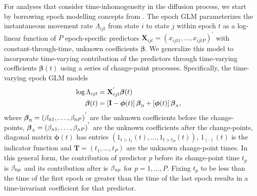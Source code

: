 \documentclass[11pt,oneside,letterpaper]{article}
\newcommand{\coefficient}{\ensuremath{\beta}}
\newcommand{\transpose}{^{'}}
\newcommand{\numPredictors}{P}
\newcommand{\timeIndicator}{\phi}
\newcommand{\indicatorFunction}[1]{\ensuremath{1_{ #1 }}}
\newcommand{\rateMatrixElementMAS}{\Lambda_{ijt}}
\newcommand{\markA}{\text{\tiny B}}
\newcommand{\markB}{\text{\tiny A}}
\begin{document}
For analyses that consider time-inhomogeneity in the diffusion process, we start by borrowing epoch modelling concepts from \cite{bielejec_epoch_2014}.
The epoch GLM parameterizes the instantaneous movement rate $\rateMatrixElementMAS$ from state $i$ to state $j$ within epoch $t$ as a log-linear function of $\numPredictors$ epoch-specific predictors $\mathbf{X}_{ijt} = \left( x_{ijt1} , \ldots, x_{ijt \numPredictors} \right)\transpose $ with constant-through-time, unknown coefficients $\boldsymbol{\coefficient}$. 
We generalize this model to incorporate time-varying contribution of the predictors through time-varying coefficients $\boldsymbol{\coefficient}(t)$ using
a series of change-point processes.  
Specifically, the time-varying epoch GLM models
\begin{equation}
\begin{aligned}
\log \rateMatrixElementMAS &= \mathbf{X}_{ijt}\transpose 
\boldsymbol{\beta} (t) \\
\boldsymbol{\beta} (t) &= 
\left[
\mathbf{I} - \boldsymbol{\timeIndicator}(t) \right] 
\boldsymbol{\coefficient}_{\markA} + 
\left[
\boldsymbol{\timeIndicator}(t) 
\right] \boldsymbol{\beta}_{\markB} ,
\end{aligned}
\end{equation}
%
where 
$\boldsymbol{\coefficient}_{\markA} = \left(\coefficient_{\markA1}, \ldots, \coefficient_{\markA\numPredictors} \right)\transpose$ are the unknown coefficients before the change-points,
$\boldsymbol{\coefficient}_{\markB} = \left(\coefficient_{\markB1}, \ldots, \coefficient_{\markB\numPredictors} \right)\transpose$ are 
the unknown coefficients after the change-points,
diagonal matrix $\boldsymbol{\timeIndicator}(t)$ has entries
$\left( \indicatorFunction{t > t_1}(t), \ldots, \indicatorFunction{t > t_{\numPredictors}}(t) \right)$,
$\indicatorFunction{(\cdot)}(t)$ is the indicator function and
$\mathbf{T} = (t_1, \ldots, t_{\numPredictors})$ are the unknown change-point times.
In this general form, the contribution of predictor $p$ before its change-point time $t_p$ is 
$\coefficient_{\markA p}$
and its contribution after is 
$\coefficient_{\markB p}$
for $p = 1,\ldots,\numPredictors$.  
Fixing $t_p$ to be less than the time of the first epoch or greater than the time of the last epoch results in a time-invariant coefficient for that predictor.
\end{document}

